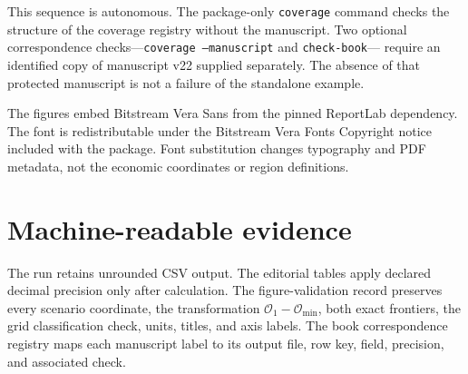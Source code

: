 \documentclass[11pt]{article}
\newcommand{\OO}{\mathcal O}
\begin{document}
This sequence is autonomous. The package-only \texttt{coverage} command checks
the structure of the coverage registry without the manuscript. Two optional
correspondence checks---\texttt{coverage --manuscript} and \texttt{check-book}---
require an identified copy of manuscript v22 supplied separately. The absence of
that protected manuscript is not a failure of the standalone example.

The figures embed Bitstream Vera Sans from the pinned ReportLab dependency. The
font is redistributable under the Bitstream Vera Fonts Copyright notice included
with the package. Font substitution changes typography and PDF metadata, not the
economic coordinates or region definitions.

\section{Machine-readable evidence}

The run retains unrounded CSV output. The editorial tables apply declared decimal
precision only after calculation. The figure-validation record preserves every
scenario coordinate, the transformation $\OO_1-\OO_{\min}$, both exact
frontiers, the grid classification check, units, titles, and axis labels. The
book correspondence registry maps each manuscript label to its output file, row
key, field, precision, and associated check.
\end{document}
